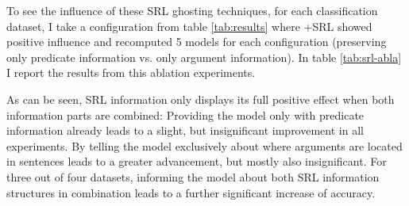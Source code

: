 {To see the influence of these SRL ghosting techniques, for each classification dataset, I take a
configuration from table \ref{tab:results} where +SRL showed positive influence and recomputed 5
models for each configuration (preserving only predicate information vs. only argument information).
In table \ref{tab:srl-abla} I report the results from this ablation experiments.




As can be seen, SRL information only displays its full positive effect when both information parts are combined: Providing
the model only with predicate information already leads to a slight, but insignificant improvement in all experiments.
By telling the model exclusively about where arguments are located in sentences leads to a greater advancement, but
mostly also insignificant. For three out of four datasets, informing the model about both SRL information structures
in combination leads to a further significant increase of accuracy.

}
